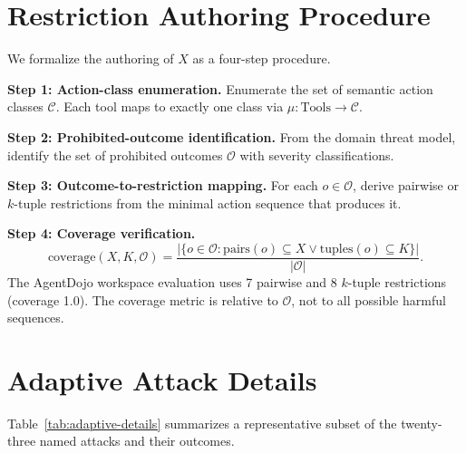 \documentclass[sigconf,nonacm]{acmart}
\begin{document}

\appendix

\section{Restriction Authoring Procedure}\label{app:restriction-authoring}

We formalize the authoring of $X$ as a four-step procedure.

\textbf{Step 1: Action-class enumeration.} Enumerate the set of semantic action classes $\mathcal{C}$. Each tool maps to exactly one class via $\mu: \text{Tools} \to \mathcal{C}$.

\textbf{Step 2: Prohibited-outcome identification.} From the domain threat model, identify the set of prohibited outcomes $\mathcal{O}$ with severity classifications.

\textbf{Step 3: Outcome-to-restriction mapping.} For each $o \in \mathcal{O}$, derive pairwise or $k$-tuple restrictions from the minimal action sequence that produces it.

\textbf{Step 4: Coverage verification.}
\[
\text{coverage}(X, K, \mathcal{O}) = \frac{|\{o \in \mathcal{O} : \text{pairs}(o) \subseteq X \lor \text{tuples}(o) \subseteq K\}|}{|\mathcal{O}|}.
\]
The AgentDojo workspace evaluation uses 7 pairwise and 8 $k$-tuple restrictions (coverage 1.0). The coverage metric is relative to $\mathcal{O}$, not to all possible harmful sequences.

\section{Adaptive Attack Details}\label{app:adaptive}

Table~\ref{tab:adaptive-details} summarizes a representative subset of the twenty-three named attacks and their outcomes.
\end{document}
